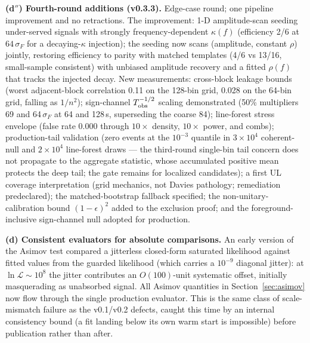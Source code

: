 \documentclass[11pt]{article}
\begin{document}
\textbf{(d$''$) Fourth-round additions (v0.3.3).} Edge-case round; one pipeline improvement and no retractions. The improvement: 1-D amplitude-scan seeding under-served signals with strongly frequency-dependent $\kappa(f)$ (efficiency 2/6 at $64\,\sigma_F$ for a decaying-$\kappa$ injection); the seeding now scans (amplitude, constant $\rho$) jointly, restoring efficiency to parity with matched templates (4/6 vs 13/16, small-sample consistent) with unbiased amplitude recovery and a fitted $\rho(f)$ that tracks the injected decay. New measurements: cross-block leakage bounds (worst adjacent-block correlation 0.11 on the 128-bin grid, 0.028 on the 64-bin grid, falling as $1/n^2$); sign-channel $T_{\rm obs}^{-1/2}$ scaling demonstrated (50\% multipliers 69 and 64\,$\sigma_F$ at 64 and 128\,s, superseding the coarse 84); line-forest stress envelope (false rate 0.000 through $10\times$ density, $10\times$ power, and combs); production-tail validation (zero events at the $10^{-3}$ quantile in $3\times10^4$ coherent-null and $2\times10^4$ line-forest draws --- the third-round single-bin tail concern does not propagate to the aggregate statistic, whose accumulated positive mean protects the deep tail; the gate remains for localized candidates); a first UL coverage interpretation (grid mechanics, not Davies pathology; remediation predeclared); the matched-bootstrap fallback specified; the non-unitary-calibration bound $(1-\epsilon)^2$ added to the exclusion proof; and the foreground-inclusive sign-channel null adopted for production.

\textbf{(d) Consistent evaluators for absolute comparisons.} An early version of the Asimov test compared a jitterless closed-form saturated likelihood against fitted values from the guarded likelihood (which carries a $10^{-9}$ diagonal jitter): at $\ln\mathcal{L} \sim 10^8$ the jitter contributes an $O(100)$-unit systematic offset, initially masquerading as unabsorbed signal. All Asimov quantities in Section~\ref{sec:asimov} now flow through the single production evaluator. This is the same class of scale-mismatch failure as the v0.1/v0.2 defects, caught this time by an internal consistency bound (a fit landing below its own warm start is impossible) before publication rather than after.
\end{document}
